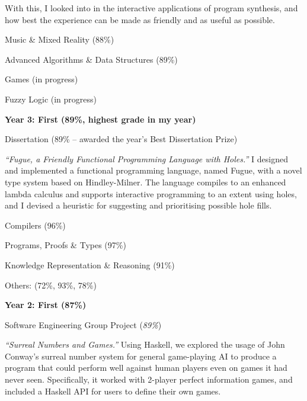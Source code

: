 \documentclass[12pt]{article}
\begin{document}
\begin{explist}
{\begin{explist}
\begin{explist}
\begin{explist}
			        With this, I looked into in the interactive applications of program synthesis, and how best the experience can be made as friendly and as useful as possible.
			      \end{explist}
			      \begin{multicols}{2}
			      	\item Music \& Mixed Reality (88\%)
					\item Advanced Algorithms \& Data Structures (89\%)
					\item Games (in progress)
					\item Fuzzy Logic (in progress)
			      \end{multicols}
			    \end{explist}
    		  \item[] \textbf{Year 3: First (89\%, \textnormal{highest grade in my year})}
		  	\begin{explist}
    		      \item Dissertation (89\% -- awarded the year's Best Dissertation Prize)
		      	\begin{explist}
    		          \item \textit{``Fugue, a Friendly Functional Programming Language with Holes.''}
I designed and implemented a functional programming language, named Fugue, with a novel type system based on Hindley-Milner. The language compiles to an enhanced lambda calculus and supports interactive programming to an extent using holes, and I devised a heuristic for suggesting and prioritising possible hole fills.
		          \end{explist}
		          \begin{multicols}{2}
				     \item Compilers (96\%)
				     \item Programs, Proofs \& Types (97\%)
				     \item Knowledge Representation \& Reasoning (91\%)
				     \item Others: (72\%, 93\%, 78\%)
				     \end{multicols}
		        \end{explist}
    		   \item[] \textbf{Year 2: First (87\%)}
		   		\begin{explist}
    		          \item Software Engineering Group Project (\textit{89\%})
		          	  \begin{explist}
    		  		     \item \textit{``Surreal Numbers and Games.''} Using Haskell, we explored the usage of John Conway's surreal number system for general game-playing AI to produce a program that could perform well against human players even on games it had never seen. Specifically, it worked with 2-player perfect information games, and included a Haskell API for users to define their own games.
				     \end{explist}


\end{explist}
\end{explist}}
\end{explist}
\end{document}
